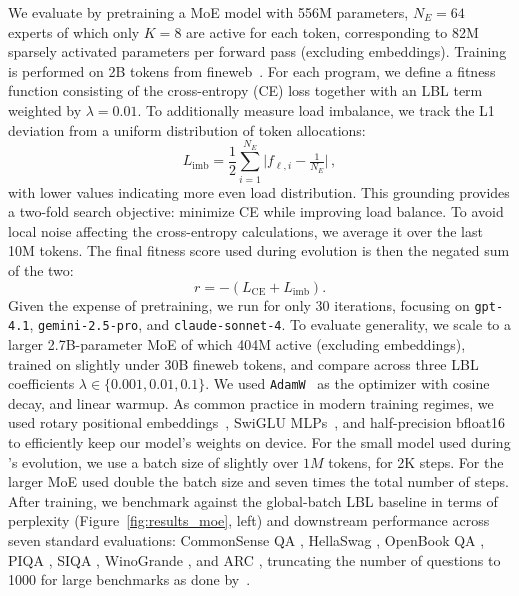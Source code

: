 We evaluate \ouralgo by pretraining a MoE model with 556M parameters, $N_E=64$ experts of which only $K=8$ are active for each token, corresponding to 82M sparsely activated parameters per forward pass (excluding embeddings). Training is performed on 2B tokens from fineweb~\citep{fineweb}. For each program, we define a fitness function consisting of the cross-entropy (CE) loss together with an LBL term weighted by $\lambda=0.01$. To additionally measure load imbalance, we track the L1 deviation from a uniform distribution of token allocations:
\begin{equation}
\label{eq:moe_load_imbalance_extended}
L_{\mathrm{imb}}
= \frac{1}{2}\sum_{i=1}^{N_E} \bigl|f_{\ell,i}- \tfrac{1}{N_E}\bigr| \, ,
\end{equation}
with lower values indicating more even load distribution. This grounding provides \ouralgo a two-fold search objective: minimize CE while improving load balance. To avoid local noise affecting the cross-entropy calculations, we average it over the last 10M tokens. The final fitness score used during evolution is then the negated sum of the two:
\begin{equation}
\label{eq:moe_ce_imb_tradeoff}
r= -(L_\mathrm{CE}
+ L_{\mathrm{imb}}).
\end{equation}
Given the expense of pretraining, we run \ouralgo for only 30 iterations, focusing on \texttt{gpt-4.1}, \texttt{gemini-2.5-pro}, and \texttt{claude-sonnet-4}. To evaluate generality, we scale to a larger 2.7B-parameter MoE of which 404M active (excluding embeddings), trained on slightly under 30B fineweb tokens, and compare across three LBL coefficients $\lambda \in \{0.001, 0.01, 0.1\}$. We used \texttt{AdamW}~\citep{adamw} as the optimizer with cosine decay, and linear warmup. As common practice in modern training regimes, we used rotary positional embeddings~\citep{rope}, SwiGLU MLPs~\citep{swiglu}, and half-precision bfloat16 to efficiently keep our model's weights on device. For the small model used during \ouralgo's evolution, we use a batch size of slightly over $1M$ tokens, for 2K steps. For the larger MoE used double the batch size and seven times the total number of steps. After training, we benchmark against the global-batch LBL baseline in terms of perplexity (Figure~\ref{fig:results_moe}, left) and downstream performance across seven standard evaluations: CommonSense QA \citep{moe_bench_1_commonsenseqa}, HellaSwag \citep{moe_bench_2_hellaswag}, OpenBook QA \citep{moe_bench_3_openbook_qa}, PIQA \citep{moe_bench_4_piqa}, SIQA \citep{moe_bench_5_siqa}, 
WinoGrande \citep{moe_bench_6_winogrande}, and ARC \citep{moe_bench_7_arc}, truncating the number of questions to 1000 for large benchmarks as done by~\citep{fineweb}.

